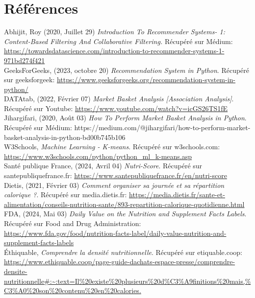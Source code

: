 \documentclass[11pt]{article}
\begin{document}
\newpage


\section{Références}

Abhijit, Roy (2020, Juillet 29) \textit{Introduction To Recommender Systems- 1: Content-Based Filtering And Collaborative Filtering.} Récupéré sur Médium: \url{https://towardsdatascience.com/introduction-to-recommender-systems-1-971bd274f421}\\

GeeksForGeeks, (2023, octobre 20) \textit{Recommendation System in Python}. Récupéré sur geeksforgeek: \url{https://www.geeksforgeeks.org/recommendation-system-in-python/}\\

DATAtab, (2022, Février 07) \textit{Market Basket Analysis [Association Analysis]}. Récupéré sur Youtube: \url{https://www.youtube.com/watch?v=icGS26TS1fE}\\

Jihargifari, (2020, Août 03) \textit{How To Perform Market Basket Analysis in Python}. Récupéré sur Médium: https://medium.com/@jihargifari/how-to-perform-market-basket-analysis-in-python-bd00b745b106 \\

W3Schools, \textit{Machine Learning - K-means}. Récupéré sur w3schools.com: \url{https://www.w3schools.com/python/python_ml_k-means.asp}\\

Santé publique France, (2024, Avril 04) \textit{Nutri-Score}. Récupéré sur santepubliquefrance.fr: \url{https://www.santepubliquefrance.fr/en/nutri-score}\\

Dietis, (2021, Février 03) \textit{Comment organiser sa journée et sa répartition calorique ?}. Récupéré sur media.dietis.fr: \url{https://media.dietis.fr/sante-et-alimentation/conseils-nutrition-sante/893-repartition-calorique-quotidienne.html}\\

FDA, (2024, Mai 03) \textit{Daily Value on the Nutrition and Supplement Facts Labels}. Récupéré sur Food and Drug Administration: \url{https://www.fda.gov/food/nutrition-facts-label/daily-value-nutrition-and-supplement-facts-labels}\\

Éthiquable, \textit{Comprendre la densité nutritionnelle}. Récupéré sur etiquable.coop: \url{https://www.ethiquable.coop/page-guide-dachats-espace-presse/comprendre-densite-nutritionnelle#:~:text=Il\%20existe\%20plusieurs\%20d\%C3\%A9finitions\%20mais,\%C3\%A0\%20son\%20contenu\%20en\%20calories.}\\
\end{document}
